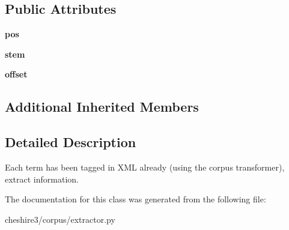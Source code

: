 \subsection*{Public Attributes}
\begin{DoxyCompactItemize}
\item 
\hypertarget{classcheshire3_1_1corpus_1_1extractor_1_1_span_x_path_tagged_term_extractor_a2c1764de7ebe2fe6d5e979edd7036ea2}{{\bfseries pos}}\label{classcheshire3_1_1corpus_1_1extractor_1_1_span_x_path_tagged_term_extractor_a2c1764de7ebe2fe6d5e979edd7036ea2}

\item 
\hypertarget{classcheshire3_1_1corpus_1_1extractor_1_1_span_x_path_tagged_term_extractor_ac3493aa3f0494670359c5ce25d33a409}{{\bfseries stem}}\label{classcheshire3_1_1corpus_1_1extractor_1_1_span_x_path_tagged_term_extractor_ac3493aa3f0494670359c5ce25d33a409}

\item 
\hypertarget{classcheshire3_1_1corpus_1_1extractor_1_1_span_x_path_tagged_term_extractor_abc7c0cdd6a7a596f49b0c50ef355f70d}{{\bfseries offset}}\label{classcheshire3_1_1corpus_1_1extractor_1_1_span_x_path_tagged_term_extractor_abc7c0cdd6a7a596f49b0c50ef355f70d}

\end{DoxyCompactItemize}
\subsection*{Additional Inherited Members}


\subsection{Detailed Description}
\begin{DoxyVerb}Each term has been tagged in XML already (using the corpus transformer), extract information.\end{DoxyVerb}
 

The documentation for this class was generated from the following file\-:\begin{DoxyCompactItemize}
\item 
cheshire3/corpus/extractor.\-py\end{DoxyCompactItemize}
